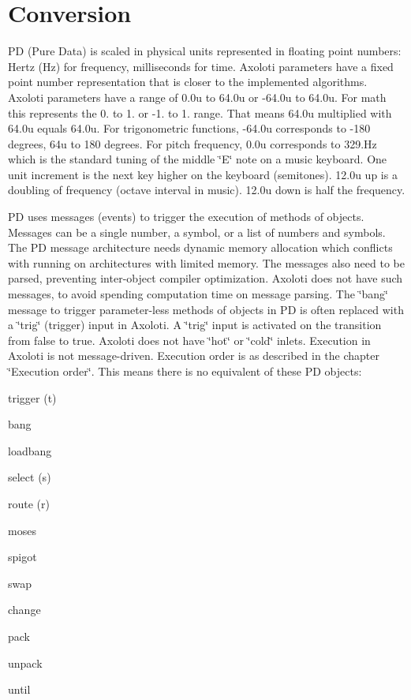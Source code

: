 \section*{Conversion}

PD (Pure Data) is scaled in physical units represented in floating point numbers\+: Hertz (Hz) for frequency, milliseconds for time. Axoloti parameters have a fixed point number representation that is closer to the implemented algorithms. Axoloti parameters have a range of 0.\+0u to 64.\+0u or -\/64.\+0u to 64.\+0u. For math this represents the 0. to 1. or -\/1. to 1. range. That means 64.\+0u multiplied with 64.\+0u equals 64.\+0u. For trigonometric functions, -\/64.\+0u corresponds to -\/180 degrees, 64u to 180 degrees. For pitch frequency, 0.\+0u corresponds to 329.\+Hz which is the standard tuning of the middle \char`\"{}\+E\char`\"{} note on a music keyboard. One unit increment is the next key higher on the keyboard (semitones). 12.\+0u up is a doubling of frequency (octave interval in music). 12.\+0u down is half the frequency.

PD uses messages (events) to trigger the execution of methods of objects. Messages can be a single number, a symbol, or a list of numbers and symbols. The PD message architecture needs dynamic memory allocation which conflicts with running on architectures with limited memory. The messages also need to be parsed, preventing inter-\/object compiler optimization. Axoloti does not have such messages, to avoid spending computation time on message parsing. The \char`\"{}bang\char`\"{} message to trigger parameter-\/less methods of objects in PD is often replaced with a \char`\"{}trig\char`\"{} (trigger) input in Axoloti. A \char`\"{}trig\char`\"{} input is activated on the transition from false to true. Axoloti does not have \char`\"{}hot\char`\"{} or \char`\"{}cold\char`\"{} inlets. Execution in Axoloti is not message-\/driven. Execution order is as described in the chapter \char`\"{}\+Execution order\char`\"{}. This means there is no equivalent of these PD objects\+: 
\begin{DoxyItemize}
\item trigger (t) 
\item bang 
\item loadbang 
\item select (s) 
\item route (r) 
\item moses 
\item spigot 
\item swap 
\item change 
\item pack 
\item unpack 
\item until 
\end{DoxyItemize}

